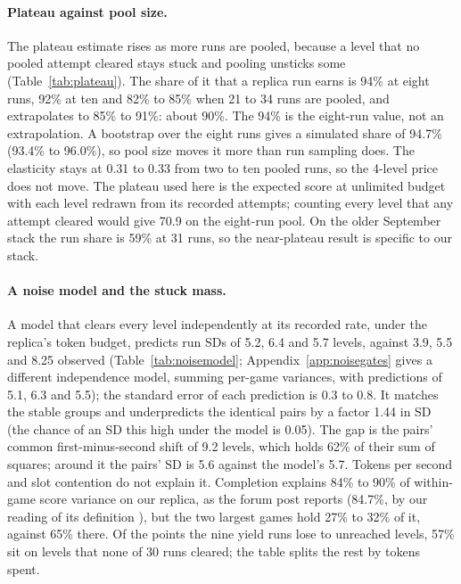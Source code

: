 

\paragraph{Plateau against pool size.}
The plateau estimate rises as more runs are pooled, because a level that no pooled attempt cleared stays stuck and pooling unsticks some (Table~\ref{tab:plateau}). %
The share of it that a replica run earns is 94\% at eight runs, 92\% at ten and 82\% to 85\% when 21 to 34 runs are pooled, and extrapolates to 85\% to 91\%: about 90\%. The 94\% is the eight-run value, not an extrapolation. %
A bootstrap over the eight runs gives a simulated share of 94.7\% (93.4\% to 96.0\%), so pool size moves it more than run sampling does. The elasticity stays at 0.31 to 0.33 from two to ten pooled runs, so the 4-level price does not move. %
The plateau used here is the expected score at unlimited budget with each level redrawn from its recorded attempts; counting every level that any attempt cleared would give 70.9 on the eight-run pool. On the older September stack the run share is 59\% at 31 runs, so the near-plateau result is specific to our stack. %





\paragraph{A noise model and the stuck mass.}
A model that clears every level independently at its recorded rate, under the replica's token budget, predicts run SDs of 5.2, 6.4 and 5.7 levels, against 3.9, 5.5 and 8.25 observed (Table~\ref{tab:noisemodel}; Appendix~\ref{app:noisegates} gives a different independence model, summing per-game variances, with predictions of 5.1, 6.3 and 5.5); the standard error of each prediction is 0.3 to 0.8. %
It matches the stable groups and underpredicts the identical pairs by a factor 1.44 in SD (the chance of an SD this high under the model is 0.05). The gap is the pairs' common first-minus-second shift of 9.2 levels, which holds 62\% of their sum of squares; around it the pairs' SD is 5.6 against the model's 5.7. Tokens per second and slot contention do not explain it. %
Completion explains 84\% to 90\% of within-game score variance on our replica, as the forum post reports (84.7\%, by our reading of its definition \citep{borro19802026forum732932}), but the two largest games hold 27\% to 32\% of it, against 65\% there. %
Of the points the nine yield runs lose to unreached levels, 57\% sit on levels that none of 30 runs cleared; the table splits the rest by tokens spent. %


